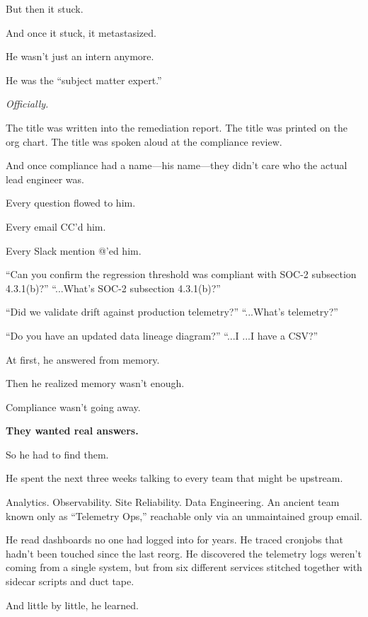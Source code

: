     \medskip
    
    But then it stuck.
    
    And once it stuck, it metastasized.
    
    He wasn’t just an intern anymore.
    
    He was the “subject matter expert.”
    
    \textit{Officially.}
    
    The title was written into the remediation report.  
    The title was printed on the org chart.  
    The title was spoken aloud at the compliance review.
    
    And once compliance had a name—his name—they didn’t care who the actual lead engineer was.
    
    Every question flowed to him.
    
    Every email CC’d him.
    
    Every Slack mention @’ed him.
    
    “Can you confirm the regression threshold was compliant with SOC-2 subsection 4.3.1(b)?”  
    “...What’s SOC-2 subsection 4.3.1(b)?”
    
    “Did we validate drift against production telemetry?”  
    “...What’s telemetry?”
    
    “Do you have an updated data lineage diagram?”  
    “...I ...I have a CSV?”
    
    At first, he answered from memory.
    
    Then he realized memory wasn’t enough.
    
    Compliance wasn’t going away.
    
    \textbf{They wanted real answers.}
    
    So he had to find them.
    
    He spent the next three weeks talking to every team that might be upstream.
    
    Analytics.  
    Observability.  
    Site Reliability.  
    Data Engineering.  
    An ancient team known only as “Telemetry Ops,” reachable only via an unmaintained group email.
    
    He read dashboards no one had logged into for years.  
    He traced cronjobs that hadn’t been touched since the last reorg.  
    He discovered the telemetry logs weren’t coming from a single system, but from six different services stitched together with sidecar scripts and duct tape.
    
    And little by little, he learned.
    
